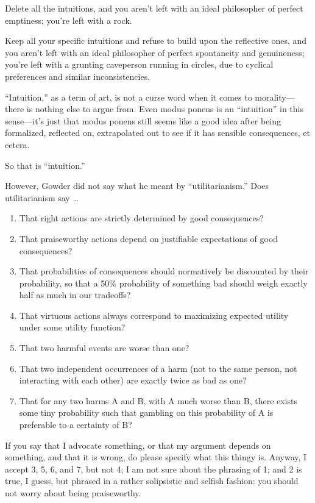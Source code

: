 {
 Delete all the intuitions, and you aren't left
with an ideal philosopher of perfect emptiness; you're
left with a rock.}

{
 Keep all your specific intuitions and refuse to build upon the
reflective ones, and you aren't left with an ideal
philosopher of perfect spontaneity and genuineness;
you're left with a grunting caveperson running in
circles, due to cyclical preferences and similar inconsistencies.}

{
 ``Intuition,'' as a term of
art, is not a curse word when it comes to morality---there is nothing
else to argue from. Even modus ponens is an
``intuition'' in this
sense---it's just that modus ponens still seems like a
good idea after being formalized, reflected on, extrapolated out to see
if it has sensible consequences, et cetera.}

{
 So that is ``intuition.''}

{
 However, Gowder did not say what he meant by
``utilitarianism.'' Does
utilitarianism say \ldots}

\begin{enumerate}
\item  That right actions are strictly determined by good consequences?
\item  That praiseworthy actions depend on justifiable expectations of
good consequences?
\item  That probabilities of consequences should normatively be
discounted by their probability, so that a 50\% probability of
something bad should weigh exactly half as much in our tradeoffs?
\item  That virtuous actions always correspond to maximizing expected
utility under some utility function?
\item  That two harmful events are worse than one?
\item  That two independent occurrences of a harm (not to the same
person, not interacting with each other) are exactly twice as bad as
one?
\item  That for any two harms A and B, with A much worse than B, there
exists some tiny probability such that gambling on this probability of
A is preferable to a certainty of B?
\end{enumerate}

{
 If you say that I advocate something, or that my argument depends
on something, and that it is wrong, do please specify what this thingy
is. Anyway, I accept 3, 5, 6, and 7, but not 4; I am not sure about the
phrasing of 1; and 2 is true, I guess, but phrased in a rather
solipsistic and selfish fashion: you should not worry about being
praiseworthy.}


